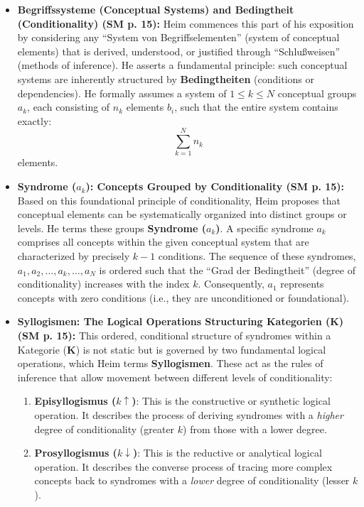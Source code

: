 \documentclass[12pt]{article}
\newcommand{\q}[1]{\enquote{#1}}
\newcommand{\kategorie}{\bm{K}}
\newcommand{\conceptualsyndrome}{a} %
\begin{document}
\begin{itemize}
    \item \textbf{Begriffssysteme (Conceptual Systems) and Bedingtheit (Conditionality) (SM p. 15):}
    Heim commences this part of his exposition by considering any \q{System von Begriffselementen} (system of conceptual elements) that is derived, understood, or justified through \q{Schlußweisen} (methods of inference). He asserts a fundamental principle: such conceptual systems are inherently structured by \textbf{Bedingtheiten} (conditions or dependencies). He formally assumes a system of \(1 \le k \le N\) conceptual groups \(a_k\), each consisting of \(n_k\) elements \(b_i\), such that the entire system contains exactly:
    \begin{equation*}
    \sum_{k=1}^N n_k
    \end{equation*}
    elements. 

    \item \textbf{Syndrome (\( \conceptualsyndrome_k \)): Concepts Grouped by Conditionality (SM p. 15):}
    Based on this foundational principle of conditionality, Heim proposes that conceptual elements can be systematically organized into distinct groups or levels. He terms these groups \textbf{Syndrome (\(\conceptualsyndrome_k\))}. A specific syndrome \( \conceptualsyndrome_k \) comprises all concepts within the given conceptual system that are characterized by precisely \( k-1 \) conditions. The sequence of these syndromes, \( \conceptualsyndrome_1, \conceptualsyndrome_2, \dots, \conceptualsyndrome_k, \dots, \conceptualsyndrome_N \) is ordered such that the \q{Grad der Bedingtheit} (degree of conditionality) increases with the index \( k \). Consequently, \( \conceptualsyndrome_1 \) represents concepts with zero conditions (i.e., they are unconditioned or foundational).

    \item \textbf{Syllogismen: The Logical Operations Structuring Kategorien (\(\kategorie\)) (SM p. 15):}
    This ordered, conditional structure of syndromes within a Kategorie (\(\kategorie\)) is not static but is governed by two fundamental logical operations, which Heim terms \textbf{Syllogismen}. These act as the rules of inference that allow movement between different levels of conditionality:
    \begin{enumerate}
        \item \textbf{Episyllogismus (\( k \uparrow \))}: This is the constructive or synthetic logical operation. It describes the process of deriving syndromes with a \textit{higher} degree of conditionality (greater \(k\)) from those with a lower degree. 
        \item \textbf{Prosyllogismus (\( k \downarrow \))}: This is the reductive or analytical logical operation. It describes the converse process of tracing more complex concepts back to syndromes with a \textit{lower} degree of conditionality (lesser \(k\)). 
    \end{enumerate}


\end{itemize}
\end{document}
